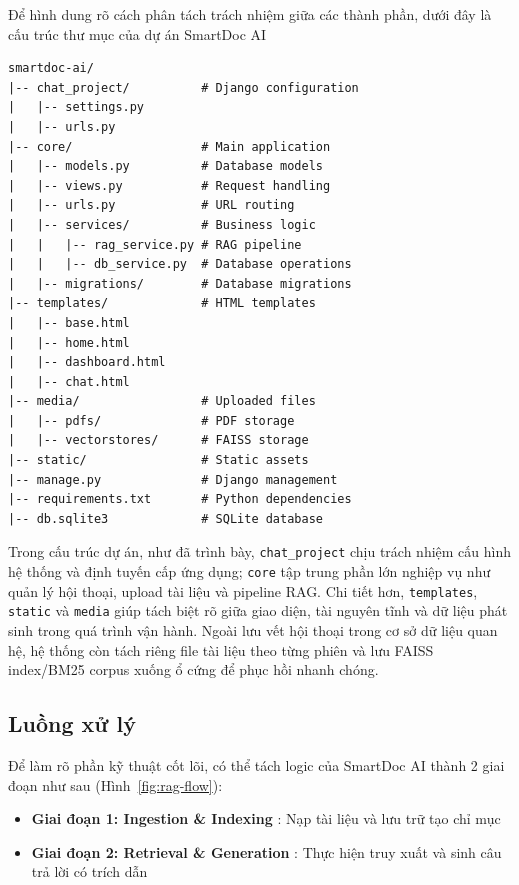 \documentclass[10pt, conference, a4paper, compsocconf]{IEEEtran}
\newcommand{\smartdoc}{SmartDoc AI}
\begin{document}
Để hình dung rõ cách phân tách trách nhiệm giữa các thành phần, dưới đây là cấu trúc thư mục của dự án \smartdoc{}

{\scriptsize
\begin{verbatim}
smartdoc-ai/
|-- chat_project/          # Django configuration
|   |-- settings.py
|   |-- urls.py
|-- core/                  # Main application
|   |-- models.py          # Database models
|   |-- views.py           # Request handling
|   |-- urls.py            # URL routing
|   |-- services/          # Business logic
|   |   |-- rag_service.py # RAG pipeline
|   |   |-- db_service.py  # Database operations
|   |-- migrations/        # Database migrations
|-- templates/             # HTML templates
|   |-- base.html
|   |-- home.html
|   |-- dashboard.html
|   |-- chat.html
|-- media/                 # Uploaded files
|   |-- pdfs/              # PDF storage
|   |-- vectorstores/      # FAISS storage
|-- static/                # Static assets
|-- manage.py              # Django management
|-- requirements.txt       # Python dependencies
|-- db.sqlite3             # SQLite database
\end{verbatim}
}

Trong cấu trúc dự án, như đã trình bày, \texttt{chat\_project} chịu trách nhiệm cấu hình hệ thống và định tuyến cấp ứng dụng; \texttt{core} tập trung phần lớn nghiệp vụ như quản lý hội thoại, upload tài liệu và pipeline RAG. Chi tiết hơn, \texttt{templates}, \texttt{static} và \texttt{media} giúp tách biệt rõ giữa giao diện, tài nguyên tĩnh và dữ liệu phát sinh trong quá trình vận hành. Ngoài lưu vết hội thoại trong cơ sở dữ liệu quan hệ, hệ thống còn tách riêng file tài liệu theo từng phiên và lưu FAISS index/BM25 corpus xuống ổ cứng để phục hồi nhanh chóng.

\subsection{Luồng xử lý}

Để làm rõ phần kỹ thuật cốt lõi, có thể tách logic của \smartdoc{} thành 2 giai đoạn như sau (Hình~\ref{fig:rag-flow}):

\begin{itemize}
  \item \textbf{Giai đoạn 1: Ingestion \& Indexing} : Nạp tài liệu và lưu trữ tạo chỉ mục 
  \item \textbf{Giai đoạn 2: Retrieval \& Generation} : Thực hiện truy xuất và sinh câu trả lời có trích dẫn
\end{itemize}
\end{document}

